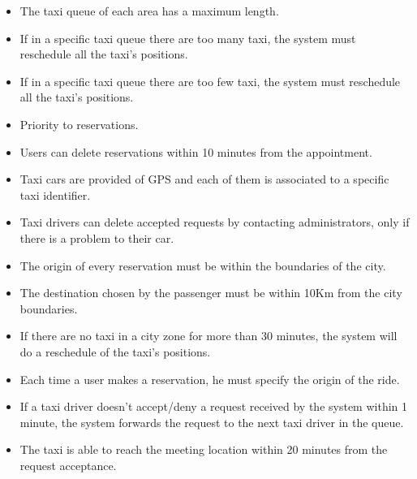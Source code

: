 \begin{itemize}
	\item The taxi queue of each area has a maximum length.
	\item If in a specific taxi queue there are too many taxi,  
	the system must reschedule all the taxi's positions.
	\item If in a specific taxi queue there are too few taxi,  
	the system must reschedule all the taxi's positions.
	\item Priority to reservations.
	\item Users can delete reservations within 10 minutes from the appointment. 
	\item Taxi cars are provided of GPS and each of them is associated to a specific taxi identifier.
	\item Taxi drivers can delete accepted requests by contacting administrators, only if there is a problem to their car.
	\item The origin of every reservation must be within the boundaries of the city.
	\item The destination chosen by the passenger must be within 10Km from the city boundaries.
	\item If there are no taxi in a city zone for more than 30 minutes, the system will do a reschedule of the taxi's positions.
	\item Each time a user makes a reservation, he must specify the origin of the ride.
	\item If a taxi driver doesn't accept/deny a request received by the system within 1 minute, the system forwards the request to the next taxi driver in the queue.
	\item The taxi is able to reach the meeting location within 20 minutes from the request acceptance.
\end{itemize}